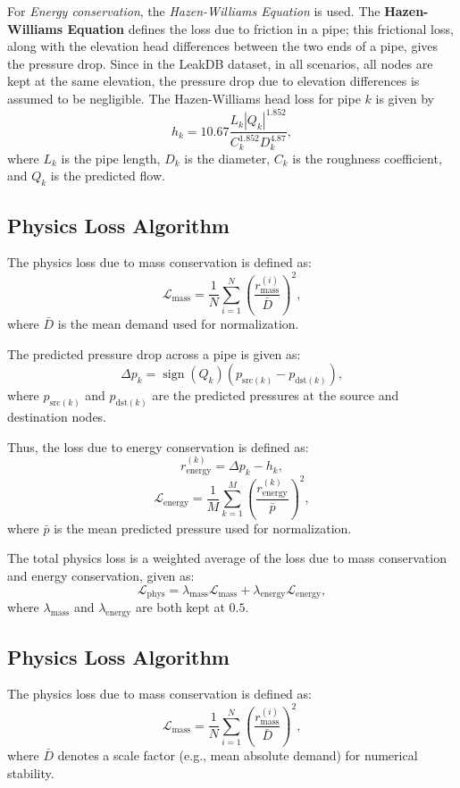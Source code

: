 \documentclass[final,5p,times,twocolumn,authoryear]{elsarticle}
\begin{document}
\vspace{0.3cm}

For \textit{Energy conservation}, the \textit{Hazen-Williams Equation} is used. The \textbf{Hazen-Williams Equation} defines the loss due to friction in a pipe; this frictional loss, along with the elevation head differences between the two ends of a pipe, gives the pressure drop. Since in the LeakDB dataset, in all scenarios, all nodes are kept at the same elevation, the pressure drop due to elevation differences is assumed to be negligible. The Hazen-Williams head loss for pipe $k$ is given by
\[
h_k
=
10.67 \frac{L_k |Q_k|^{1.852}}{C_k^{1.852} D_k^{4.87}},
\]
where $L_k$ is the pipe length, $D_k$ is the diameter, $C_k$ is the roughness coefficient, and $Q_k$ is the predicted flow.

\subsection{Physics Loss Algorithm}
The physics loss due to mass conservation is defined as:
\[
\mathcal{L}_{\mathrm{mass}}
=
\frac{1}{N} \sum_{i=1}^{N} \left( \frac{r^{(i)}_{\mathrm{mass}}}{\bar{D}} \right)^2,
\]
where $\bar{D}$ is the mean demand used for normalization.

The predicted pressure drop across a pipe is given as:
\[
\Delta p_k
=
\operatorname{sign}(Q_k) \left( p_{\mathrm{src}(k)} - p_{\mathrm{dst}(k)} \right),
\]
where $p_{\mathrm{src}(k)}$ and $p_{\mathrm{dst}(k)}$ are the predicted pressures at the source and destination nodes.

Thus, the loss due to energy conservation is defined as:
\[
r^{(k)}_{\mathrm{energy}}
=
\Delta p_k - h_k,
\]
\[
\mathcal{L}_{\mathrm{energy}}
=
\frac{1}{M} \sum_{k=1}^{M} \left( \frac{r^{(k)}_{\mathrm{energy}}}{\bar{p}} \right)^2,
\]
where $\bar{p}$ is the mean predicted pressure used for normalization.

The total physics loss is a weighted average of the loss due to mass conservation and energy conservation, given as:
\[
\mathcal{L}_{\mathrm{phys}}
=
\lambda_{\mathrm{mass}} \mathcal{L}_{\mathrm{mass}}
+
\lambda_{\mathrm{energy}} \mathcal{L}_{\mathrm{energy}},
\]
where $\lambda_{\mathrm{mass}}$ and $\lambda_{\mathrm{energy}}$ are both kept at $0.5$.

\subsection{Physics Loss Algorithm}
The physics loss due to mass conservation is defined as:
\[
\mathcal{L}_{\mathrm{mass}}
=
\frac{1}{N} \sum_{i=1}^{N} \left( \frac{r^{(i)}_{\mathrm{mass}}}{\bar{D}} \right)^2,
\]
where $\bar{D}$ denotes a scale factor (e.g., mean absolute demand) for numerical stability.
\end{document}
